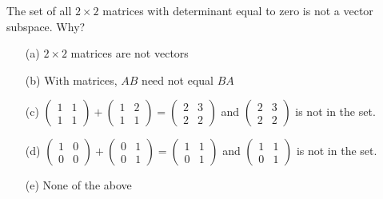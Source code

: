 \begin{problem}
    The set of all $2 \times2$ matrices with determinant equal to zero is not a vector
    subspace.  Why?
    \begin{enumerate}
        \item[(a)] $2\times 2$ matrices are not vectors
        \item[(b)] With matrices, $AB$ need not equal $BA$
        \item[(c)] $\begin{pmatrix} 1 & 1 \\ 1 & 1 \end{pmatrix} + \begin{pmatrix} 1 & 2
                \\ 1 & 1 \end{pmatrix} = \begin{pmatrix} 2 & 3 \\ 2 & 2 \end{pmatrix}$ and
                    $\begin{pmatrix} 2 & 3 \\ 2 & 2 \end{pmatrix}$ is not in the set.
        \item[(d)] $\begin{pmatrix} 1 & 0 \\ 0 & 0 \end{pmatrix} + \begin{pmatrix} 0 & 1
                \\ 0 & 1 \end{pmatrix} = \begin{pmatrix} 1 & 1 \\ 0 & 1 \end{pmatrix}$ and
                    $\begin{pmatrix} 1 & 1 \\ 0 & 1 \end{pmatrix}$ is not in the set.
        \item[(e)] None of the above
    \end{enumerate}
\end{problem}


%             


